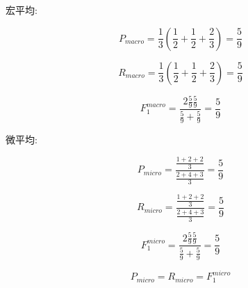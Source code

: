 宏平均:

\[P_{macro} = \frac{1}{3}(\frac{1}{2} + \frac{1}{2} + \frac{2}{3}) = \frac{5}{9}\]

\[R_{macro} = \frac{1}{3}(\frac{1}{2} + \frac{1}{2} + \frac{2}{3}) = \frac{5}{9}\]

\[F_1^{macro} = \frac{2\frac{5}{9}\frac{5}{9}}{\frac{5}{9} + \frac{5}{9}} = \frac{5}{9}\]

微平均:

\[P_{micro} = \frac{\frac{1+2+2}{3}}{\frac{2+4+3}{3}} = \frac{5}{9}\]

\[R_{micro} = \frac{\frac{1+2+2}{3}}{\frac{2+4+3}{3}} = \frac{5}{9}\]

\[F_1^{micro} = \frac{2\frac{5}{9}\frac{5}{9}}{\frac{5}{9} + \frac{5}{9}} = \frac{5}{9}\]

\[P_{micro} = R_{micro} = F_1^{micro}\]





